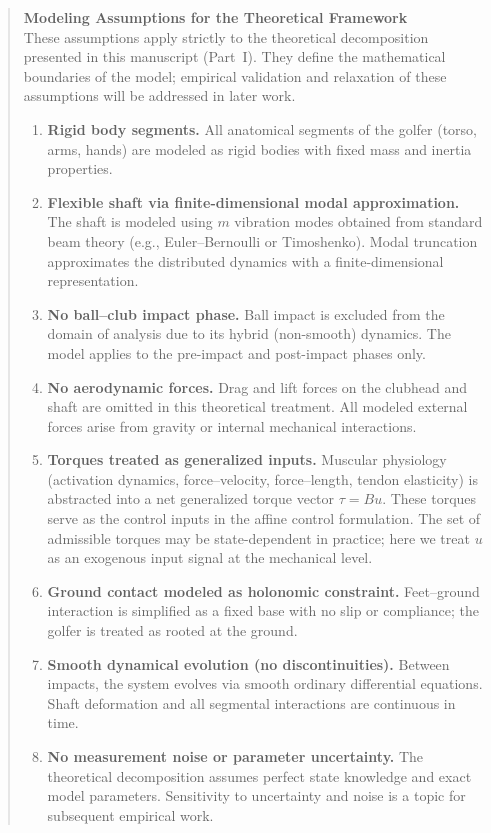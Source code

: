 \documentclass[12pt]{article}
\begin{document}
\begin{quote}
\textbf{Modeling Assumptions for the Theoretical Framework}\\
These assumptions apply strictly to the theoretical decomposition presented in this manuscript (Part~I). They define the mathematical boundaries of the model; empirical validation and relaxation of these assumptions will be addressed in later work.
\begin{enumerate}
  \item \textbf{Rigid body segments.} All anatomical segments of the golfer (torso, arms, hands) are modeled as rigid bodies with fixed mass and inertia properties.
  \item \textbf{Flexible shaft via finite-dimensional modal approximation.} The shaft is modeled using \( m \) vibration modes obtained from standard beam theory (e.g., Euler--Bernoulli or Timoshenko). Modal truncation approximates the distributed dynamics with a finite-dimensional representation.
  \item \textbf{No ball--club impact phase.} Ball impact is excluded from the domain of analysis due to its hybrid (non-smooth) dynamics. The model applies to the pre-impact and post-impact phases only.
  \item \textbf{No aerodynamic forces.} Drag and lift forces on the clubhead and shaft are omitted in this theoretical treatment. All modeled external forces arise from gravity or internal mechanical interactions.
  \item \textbf{Torques treated as generalized inputs.} Muscular physiology (activation dynamics, force--velocity, force--length, tendon elasticity) is abstracted into a net generalized torque vector \( \tau = B u \). These torques serve as the control inputs in the affine control formulation. The set of admissible torques may be state-dependent in practice; here we treat \(u\) as an exogenous input signal at the mechanical level.
  \item \textbf{Ground contact modeled as holonomic constraint.} Feet--ground interaction is simplified as a fixed base with no slip or compliance; the golfer is treated as rooted at the ground.
  \item \textbf{Smooth dynamical evolution (no discontinuities).} Between impacts, the system evolves via smooth ordinary differential equations. Shaft deformation and all segmental interactions are continuous in time.
  \item \textbf{No measurement noise or parameter uncertainty.} The theoretical decomposition assumes perfect state knowledge and exact model parameters. Sensitivity to uncertainty and noise is a topic for subsequent empirical work.
\end{enumerate}
\end{quote}
\end{document}
